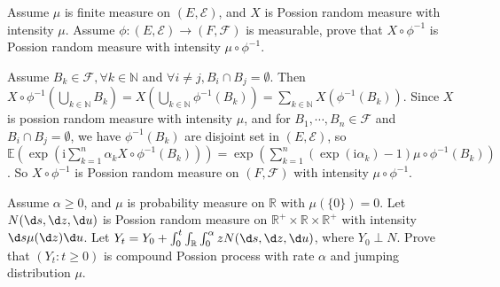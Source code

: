 \documentclass[../main]{subfiles}
\begin{document}
\begin{problem}\label{pro:3}
  Assume \(\mu\) is finite measure on \((E,\mathcal{E})\), and \(X\) is Possion random measure with intensity \(\mu\).
  Assume \(\phi:(E,\mathcal{E}) \to (F,\mathcal{F})\) is measurable, prove that
  \(X \circ \phi^{-1}\) is Possion random measure with intensity \(\mu \circ \phi^{-1}\).
\end{problem}
\begin{solution}
  Assume \(B_k \in \mathcal{F},\forall k \in \mathbb{N}\) and \(\forall i \neq j,B_i \cap B_j = \emptyset\).
  Then \(X \circ \phi^{-1} (\bigcup_{k \in \mathbb{N}}B_k)=X(\bigcup_{k \in \mathbb{N}}\phi^{-1}(B_k))=\sum_{k \in \mathbb{N}}X(\phi^{-1}(B_k))\).
  Since \(X\) is possion random measure with intensity \(\mu\), and for \(B_1,\cdots,B_n \in \mathcal{F}\) and \(B_i \cap B_j=\emptyset\), we have \(\phi^{-1}(B_k)\) are disjoint set in \((E,\mathcal{E})\), so
  \(\mathbb{E}(\exp(\mathrm{i}\sum_{k=1}^{n} \alpha_k X \circ \phi^{-1}(B_k)))=\exp(\sum_{k=1}^{n} (\exp(\mathrm{i}\alpha_k)-1)\mu \circ \phi^{-1}(B_k))\).
  So \(X \circ \phi^{-1}\) is Possion random measure on \((F,\mathcal{F})\) with intensity \(\mu \circ \phi^{-1}\).
\end{solution}
\begin{problem}\label{pro:4}
  Assume \(\alpha \geq 0\), and \(\mu\) is probability measure on \(\mathbb{R}\) with \(\mu(\{0\})=0\).
  Let \(N(\d s,\d z,\d u)\) is Possion random measure on \(\mathbb{R}^+ \times \mathbb{R} \times \mathbb{R}^+\) with intensity \(\d s \mu (\d z) \d u\).
  Let \(Y_t=Y_0+\int_{0}^{t} \int_{\mathbb{R}}\int_{0}^\alpha z N(\d s,\d z, \d u)\), where \(Y_0 \perp N\).
  Prove that \((Y_t:t \geq 0)\) is compound Possion process with rate \(\alpha\) and jumping distribution \(\mu\).
\end{problem}
\end{document}
